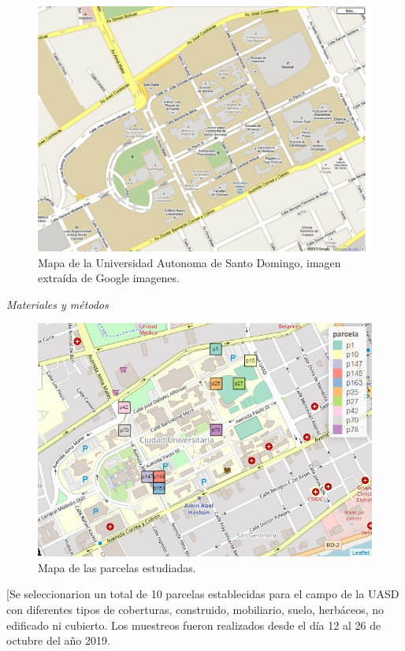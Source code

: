 \documentclass[11pt,]{article}
\begin{document}
\begin{figure}
\centering
\includegraphics{uasd.jpg}
\caption{Mapa de la Universidad Autonoma de Santo Domingo, imagen
extraída de Google imagenes.}
\end{figure}

\emph{Materiales y métodos}

\begin{figure}
\centering
\includegraphics{parcelas estudiadas.jpg}
\caption{Mapa de las parcelas estudiadas.}
\end{figure}

{[}Se seleccionarion un total de 10 parcelas establecidas para el campo
de la UASD con diferentes tipos de coberturas, construido, mobiliario,
suelo, herbáceos, no edificado ni cubierto. Los muestreos fueron
realizados desde el día 12 al 26 de octubre del año 2019.
\end{document}
